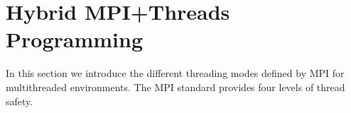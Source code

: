 \section{Hybrid MPI+Threads Programming}\label{sec:back-hybrid}

In this section we introduce the different threading modes defined by MPI for
multithreaded environments. The MPI standard provides four levels of thread safety.

\begin{figure}%
  \vspace{-1.0ex}
  \hspace{0.05\columnwidth}
  \hspace{1.0ex}
  \hspace{1.0ex}
\end{figure}
